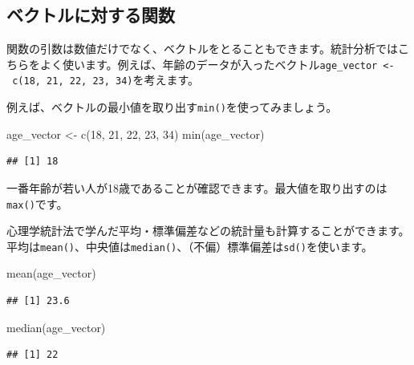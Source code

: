 \documentclass[
]{book}
\newenvironment{Shaded}{\begin{snugshade}}{\end{snugshade}}
\newcommand{\DecValTok}[1]{\textcolor[rgb]{0.00,0.00,0.81}{#1}}
\newcommand{\FunctionTok}[1]{\textcolor[rgb]{0.00,0.00,0.00}{#1}}
\newcommand{\NormalTok}[1]{#1}
\newcommand{\OtherTok}[1]{\textcolor[rgb]{0.56,0.35,0.01}{#1}}
\begin{document}
\hypertarget{ux30d9ux30afux30c8ux30ebux306bux5bfeux3059ux308bux95a2ux6570}{%
\subsection{ベクトルに対する関数}\label{ux30d9ux30afux30c8ux30ebux306bux5bfeux3059ux308bux95a2ux6570}}

関数の引数は数値だけでなく、ベクトルをとることもできます。統計分析ではこちらをよく使います。例えば、年齢のデータが入ったベクトル\texttt{age\_vector\ \textless{}-\ c(18,\ 21,\ 22,\ 23,\ 34)}を考えます。

例えば、ベクトルの最小値を取り出す\texttt{min()}を使ってみましょう。

\begin{Shaded}
\begin{Highlighting}[]
\NormalTok{age\_vector }\OtherTok{\textless{}{-}} \FunctionTok{c}\NormalTok{(}\DecValTok{18}\NormalTok{, }\DecValTok{21}\NormalTok{, }\DecValTok{22}\NormalTok{, }\DecValTok{23}\NormalTok{, }\DecValTok{34}\NormalTok{)}
\FunctionTok{min}\NormalTok{(age\_vector)}
\end{Highlighting}
\end{Shaded}

\begin{verbatim}
## [1] 18
\end{verbatim}

一番年齢が若い人が18歳であることが確認できます。最大値を取り出すのは\texttt{max()}です。

心理学統計法で学んだ平均・標準偏差などの統計量も計算することができます。平均は\texttt{mean()}、中央値は\texttt{median()}、（不偏）標準偏差は\texttt{sd()}を使います。

\begin{Shaded}
\begin{Highlighting}[]
\FunctionTok{mean}\NormalTok{(age\_vector)}
\end{Highlighting}
\end{Shaded}

\begin{verbatim}
## [1] 23.6
\end{verbatim}

\begin{Shaded}
\begin{Highlighting}[]
\FunctionTok{median}\NormalTok{(age\_vector)}
\end{Highlighting}
\end{Shaded}

\begin{verbatim}
## [1] 22
\end{verbatim}
\end{document}
